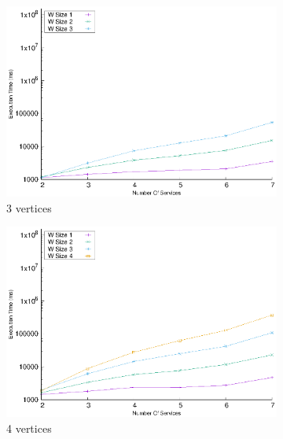   \begin{figure}[!t]
    \centering
    \begin{subfigure}{0.45\textwidth}
      \includegraphics[width=\textwidth]{Images/graphs/window_time_performance_qualitative_n7_s7_50_80_n3}
      \caption{3 vertices}
      \label{fig:time_window_perce_wide_3n}
    \end{subfigure}
    \hfill
    \begin{subfigure}{0.45\textwidth}
      \includegraphics[width=\textwidth]{Images/graphs/window_time_performance_qualitative_n7_s7_50_80_n4}
      \caption{4 vertices}
      \label{fig:time_window_perce_wide_4n}
    \end{subfigure}
    \hfill
    \begin{subfigure}{0.45\textwidth}

\end{subfigure}
\end{figure}
